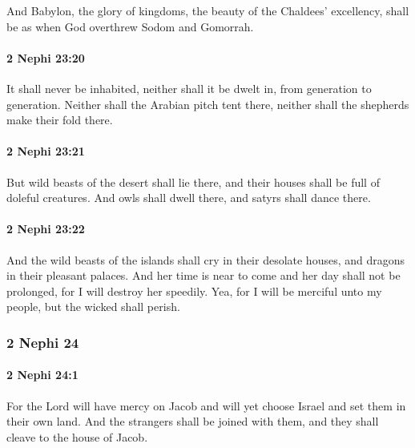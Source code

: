 			And Babylon, the glory of kingdoms, the beauty of the Chaldees' excellency,
			shall be as when God overthrew Sodom and Gomorrah.

		\paragraph{2 Nephi 23:20} %
			\label{2NEPHI-23-20}

			It shall never be inhabited, neither shall it be dwelt in,
			from generation to generation.
			Neither shall the Arabian pitch tent there,
			neither shall the shepherds make their fold there.

		\paragraph{2 Nephi 23:21} %
			\label{2NEPHI-23-21}

			But wild beasts of the desert shall lie there,
			and their houses shall be full of doleful creatures.
			And owls shall dwell there,
			and satyrs shall dance there.

		\paragraph{2 Nephi 23:22} %
			\label{2NEPHI-23-22}

			And the wild beasts of the islands shall cry in their desolate houses,
			and dragons in their pleasant palaces.
			And her time is near to come
			and her day shall not be prolonged,
			for I will destroy her speedily.
			Yea, for I will be merciful unto my people,
			but the wicked shall perish.

	\subsubsection{2 Nephi 24} %
		\label{2NEPHI-24}
		
		\paragraph{2 Nephi 24:1} %
			\label{2NEPHI-24-1}

			For the Lord will have mercy on Jacob
			and will yet choose Israel and set them in their own land.
			And the strangers shall be joined with them,
			and they shall cleave to the house of Jacob.

